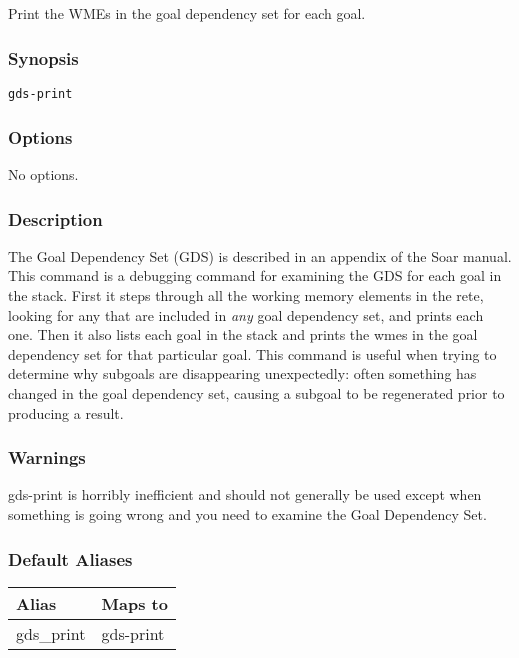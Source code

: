 \subsection{}
\label{gds-print}
Print the WMEs in the goal dependency set for each goal. 
\subsubsection*{Synopsis}
\begin{verbatim}
gds-print
\end{verbatim}
\subsubsection*{Options}
 No options. 
\subsubsection*{Description}
 The Goal Dependency Set (GDS) is described in an appendix of the Soar manual. This command is a debugging command for examining the GDS for each goal in the stack. First it steps through all the working memory elements in the rete, looking for any that are included in \emph{any}
 goal dependency set, and prints each one. Then it also lists each goal in the stack and prints the wmes in the goal dependency set for that particular goal. This command is useful when trying to determine why subgoals are disappearing unexpectedly: often something has changed in the goal dependency set, causing a subgoal to be regenerated prior to producing a result. 
\subsubsection*{Warnings}
 gds-print is horribly inefficient and should not generally be used except when something is going wrong and you need to examine the Goal Dependency Set. 
\subsubsection*{Default Aliases}
\begin{tabular}{|l|l|}
\hline 
 Alias  & Maps to  \\
 \hline 
 gds\_print  & gds-print  \\
 \hline 
\end{tabular}
